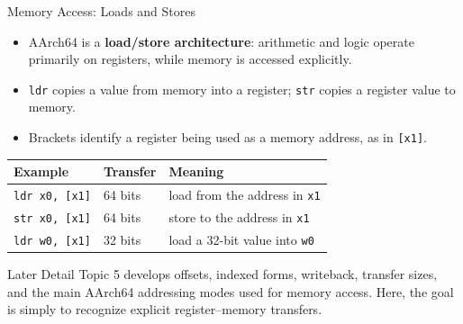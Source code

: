 \documentclass[aspectratio=169,11pt,t,xcolor=table]{beamer}
\newcommand{\key}[1]{\textbf{#1}}
\newcommand{\bits}[1]{\texttt{#1}}
\newcommand{\code}[1]{\texttt{#1}}
\begin{document}
\begin{frame}{Memory Access: Loads and Stores}
\vfill
\begin{itemize}\setlength{\itemsep}{5pt}
  \item AArch64 is a \key{load/store architecture}: arithmetic and logic operate primarily on registers, while memory is accessed explicitly.
  \item \code{ldr} copies a value from memory into a register; \code{str} copies a register value to memory.
  \item Brackets identify a register being used as a memory address, as in \code{[x1]}.
\end{itemize}

\vfill
\begin{center}
\small
\renewcommand{\arraystretch}{1.05}
\setlength{\tabcolsep}{7pt}
\begin{tabular}{lll}
\toprule
\textbf{Example} & \textbf{Transfer} & \textbf{Meaning} \\
\midrule
\rowcolor{tablerow}
\code{ldr x0, [x1]}  & 64 bits & load from the address in \bits{x1} \\
\code{str x0, [x1]}  & 64 bits & store to the address in \bits{x1} \\
\rowcolor{tablerow}
\code{ldr w0, [x1]}  & 32 bits & load a 32-bit value into \bits{w0} \\
\bottomrule
\end{tabular}
\end{center}

\vfill
\begin{block}{Later Detail}
\small Topic 5 develops offsets, indexed forms, writeback, transfer sizes, and the main AArch64 addressing modes used for memory access. Here, the goal is simply to recognize explicit register--memory transfers.
\end{block}
\vfill
\end{frame}


\end{document}
